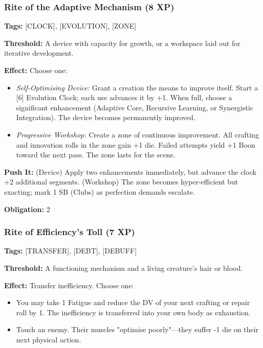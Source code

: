\subsubsection{Rite of the Adaptive Mechanism (8 XP)}

\textbf{Tags:} [CLOCK], [EVOLUTION], [ZONE]

\textbf{Threshold:} A device with capacity for growth, or a workspace laid out for iterative development.

\textbf{Effect:} Choose one:

\begin{itemize}
\item \textit{Self-Optimising Device:} Grant a creation the means to improve itself. Start a [6] Evolution Clock; each use advances it by +1. When full, choose a significant enhancement (Adaptive Core, Recursive Learning, or Synergistic Integration). The device becomes permanently improved.
\item \textit{Progressive Workshop:} Create a zone of continuous improvement. All crafting and innovation rolls in the zone gain +1 die. Failed attempts yield +1 Boon toward the next pass. The zone lasts for the scene.
\end{itemize}

\textbf{Push It:} (Device) Apply two enhancements immediately, but advance the clock +2 additional segments. (Workshop) The zone becomes hyper-efficient but exacting; mark 1 SB (Clubs) as perfection demands escalate.

\textbf{Obligation:} 2

\subsubsection{Rite of Efficiency's Toll (7 XP)}

\textbf{Tags:} [TRANSFER], [DEBT], [DEBUFF]

\textbf{Threshold:} A functioning mechanism and a living creature's hair or blood.

\textbf{Effect:} Transfer inefficiency. Choose one:

\begin{itemize}
\item You may take 1 Fatigue and reduce the DV of your next crafting or repair roll by 1. The inefficiency is transferred into your own body as exhaustion.
\item Touch an enemy. Their muscles "optimise poorly"—they suffer -1 die on their next physical action.
\end{itemize}

